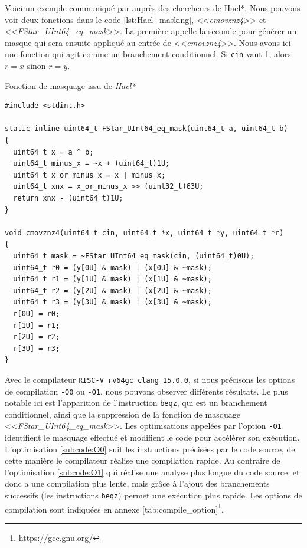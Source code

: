 Voici un exemple communiqué par \citeauthor{schneider2024breakingbadcompilersbreak} auprès des chercheurs de Hacl*. Nous pouvons voir deux fonctions dans le code \ref{lst:Hacl_masking}, <<\textit{cmovznz4}>> et <<\textit{FStar\_UInt64\_eq\_mask}>>. La première appelle la seconde pour générer un masque qui sera ensuite appliqué au entrée de <<\textit{cmovznz4}>>. Nous avons ici une fonction qui agit comme un branchement conditionnel. Si \texttt{cin} vaut 1, alors $r = x$ sinon $r = y$.

\begin{listing}[!ht]
    \caption{Fonction de masquage issu de \textit{Hacl*}}
    \label{lst:Hacl_masking}
    \begin{verbatim}
#include <stdint.h>

static inline uint64_t FStar_UInt64_eq_mask(uint64_t a, uint64_t b)
{
  uint64_t x = a ^ b;
  uint64_t minus_x = ~x + (uint64_t)1U;
  uint64_t x_or_minus_x = x | minus_x;
  uint64_t xnx = x_or_minus_x >> (uint32_t)63U;
  return xnx - (uint64_t)1U;
}

void cmovznz4(uint64_t cin, uint64_t *x, uint64_t *y, uint64_t *r)
{
  uint64_t mask = ~FStar_UInt64_eq_mask(cin, (uint64_t)0U);
  uint64_t r0 = (y[0U] & mask) | (x[0U] & ~mask);
  uint64_t r1 = (y[1U] & mask) | (x[1U] & ~mask);
  uint64_t r2 = (y[2U] & mask) | (x[2U] & ~mask);
  uint64_t r3 = (y[3U] & mask) | (x[3U] & ~mask);
  r[0U] = r0;
  r[1U] = r1;
  r[2U] = r2;
  r[3U] = r3;
}
    \end{verbatim}
\end{listing}

Avec le compilateur \texttt{RISC-V rv64gc clang 15.0.0}, si nous précisons les options de compilation \texttt{-O0} ou \texttt{-O1}, nous pouvons observer différents résultats. Le plus notable ici est l'apparition de l'instruction \texttt{beqz}, qui est un branchement conditionnel, ainsi que la suppression de la fonction de masquage <<\textit{FStar\_UInt64\_eq\_mask}>>. Les optimisations appelées par l'option \texttt{-O1} identifient le masquage effectué et modifient le code pour accélérer son exécution. L'optimisation \ref{subcode:O0} suit les instructions précisées par le code source, de cette manière le compilateur réalise une compilation rapide. Au contraire de l'optimisation \ref{subcode:O1} qui réalise une analyse plus longue du code source, et donc a une compilation plus lente, mais grâce à l'ajout des branchements successifs (les instructions \texttt{beqz}) permet une exécution plus rapide. Les options de compilation sont indiquées en annexe \ref{tab:compile_option}\footnote{\url{https://gcc.gnu.org/}}.

